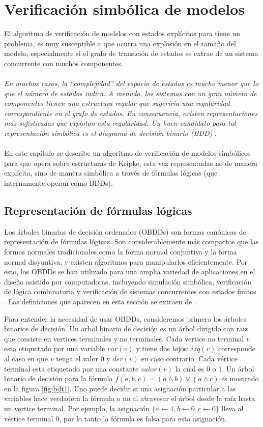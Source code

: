 \chapter{Verificación simbólica de modelos}

El algoritmo de verificación de modelos con estados explícitos para {\mucalculo} tiene un problema, es muy susceptible a que ocurra una explosión en el tamaño del modelo, especialmente si el grafo de transición de estados se extrae de un sistema concurrente con muchos componentes. \\
\\
\textit{En muchos casos, la “complejidad” del espacio de estados es mucho menor que lo que el número de estados indica. A menudo, los sistemas con un gran número de componentes tienen una estructura regular que sugeriria una regularidad correspondiente en el grafo de estados. En consecuencia, existen representaciones más sofisticadas que explotan esta regularidad. Un buen candidato para tal representación simbólica es el diagrama de decisión binario (BDD)} \cite{Burch:4}.\\ 
\\
En este capítulo se describe un algoritmo de verificación de modelos simbólicos para {\mucalculo} que opera sobre estructuras de Kripke, esta vez representadas no de manera explícita, sino de manera simbólica a través de fórmulas lógicas (que internamente operan como BDDs).

\section{Representación de fórmulas lógicas}

Los árboles binarios de decisión ordenados (OBDDs) son formas canónicas de representación de fórmulas lógicas. Son considerablemente más compactos que las formas normales tradicionales como la forma normal conjuntiva y la forma normal disyuntiva, y existen algoritmos para manipularlos eficientemente. Por esto, los OBDDs se han utilizado para una amplia variedad de aplicaciones en el diseño asistido por computadoras, incluyendo simulación simbólica, verificación de lógica combinatoria y verificación de sistemas concurrentes con estados finitos \cite{Clarke:1}. Las definiciones que aparecen en esta sección se extraen de \cite{Clarke:1}.

\noindent Para entender la necesidad de usar OBDDs, consideremos primero los árboles binarios de decisión. Un arbol binario de decisión es un árbol dirigido con raiz que consiste en vertices terminales y no terminales. Cada vertice no terminal $v$ esta etiquetado por una variable $var(v)$ y tiene dos hijos: $izq(v)$ corresponde al caso en que $v$ tenga el valor 0 y $der(v)$ en caso contrario. Cada vértice terminal esta etiquetado por una constante $valor(v)$ la cual es 0 o 1. Un árbol binario de decisión para la fórmula $f(a,b,c) = (a \land b) \lor (a \land c)$ es mostrado en la figura \ref{fig:bdt1}. Uno puede decidir si una asignación particular a las variables hace verdadera la fórmula o no al atravesar el árbol desde la raíz hasta un vertice terminal. Por ejemplo, la asignación $\{ a \gets 1, b \gets 0, c \gets 0\}$ lleva al vértice terminal 0, por lo tanto la fórmula es falsa para esta asignación.

